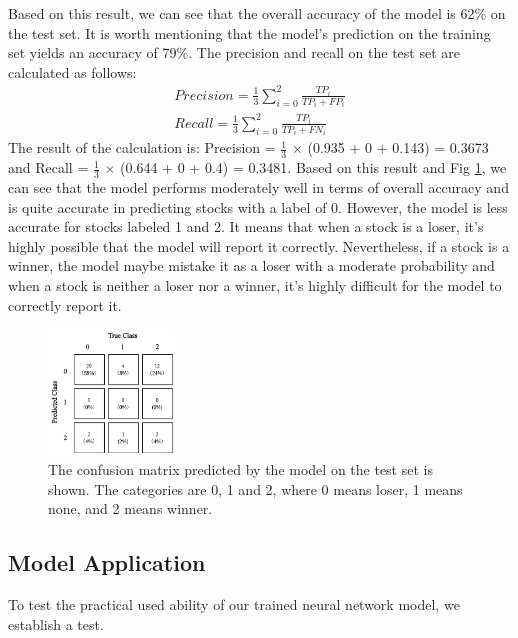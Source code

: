 \documentclass[default,iicol]{sn-jnl}%
\begin{document}
Based on this result, we can see that the overall accuracy of the model is 62\% on the test set. It is worth mentioning that the model's prediction on the training set yields an accuracy of 79\%. The precision and recall on the test set are calculated as follows: 
\begin{align}
	Precision=\frac{1}{3}  {\textstyle \sum_{i=0}^{2}}\frac{TP_{i}}{TP_{i}+FP_{i}}  \\
	Recall=\frac{1}{3}  {\textstyle \sum_{i=0}^{2}}\frac{TP_{i}}{TP_{i}+FN_{i}}  
\end{align}
The result of the calculation is: Precision = $\frac{1}{3}$ $\times$ (0.935 + 0 + 0.143) = 0.3673 and Recall = $\frac{1}{3}$ $\times$ (0.644 + 0 + 0.4) = 0.3481.
Based on this result and Fig \ref{fg7}, we can see that the model performs moderately well in terms of overall accuracy and is quite accurate in predicting stocks with a label of 0. However, the model is less accurate for stocks labeled 1 and 2. It means that when a stock is a loser, it's highly possible that the model will report it correctly. Nevertheless, if a stock is a winner, the model maybe mistake it as a loser with a moderate probability and when a stock is neither a loser nor a winner, it's highly difficult for the model to correctly report it.  
\begin{figure}[htbp]
	\centering    
	\includegraphics[width = 0.3\textwidth]{figures/Fig 7.png}
	\caption{The confusion matrix predicted by the model on the test set is shown. The categories are 0, 1 and 2, where 0 means loser, 1 means none, and 2 means winner.}
	\label{fg7}
\end{figure} 
\subsection{Model Application}\label{sec6sub3}
\hspace{1.5em}To test the practical used ability of our trained neural network model, we establish a test.
\end{document}

